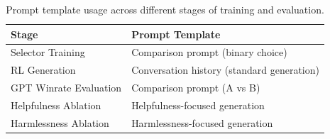 \begin{table}[h]
\centering
\caption{Prompt template usage across different stages of training and evaluation.}
\label{tab:prompt_usage}
\small
\begin{tabular}{ll}
\toprule
\textbf{Stage} & \textbf{Prompt Template} \\
\midrule
Selector Training & Comparison prompt (binary choice) \\
RL Generation & Conversation history (standard generation) \\
GPT Winrate Evaluation & Comparison prompt (A vs B) \\
Helpfulness Ablation & Helpfulness-focused generation \\
Harmlessness Ablation & Harmlessness-focused generation \\
\bottomrule
\end{tabular}
\end{table}
